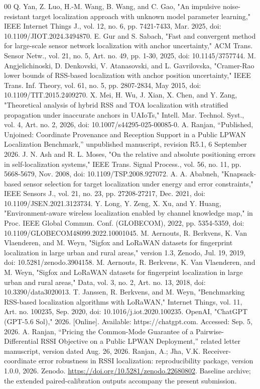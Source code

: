 \documentclass[11pt,a4paper]{article}
\begin{document}
\begin{thebibliography}{00}
 Q. Yan, Z. Luo, H.-M. Wang, B. Wang, and C. Gao, "An impulsive noise-resistant target localization approach with unknown model parameter learning," IEEE Internet Things J., vol. 12, no. 6, pp. 7421-7433, Mar. 2025, doi: 10.1109/JIOT.2024.3494870.
 E. Gur and S. Sabach, "Fast and convergent method for large-scale sensor network localization with anchor uncertainty," ACM Trans. Sensor Netw., vol. 21, no. 5, Art. no. 49, pp. 1-30, 2025, doi: 10.1145/3757744.
 M. Angjelichinoski, D. Denkovski, V. Atanasovski, and L. Gavrilovska, "Cramer-Rao lower bounds of RSS-based localization with anchor position uncertainty," IEEE Trans. Inf. Theory, vol. 61, no. 5, pp. 2807-2834, May 2015, doi: 10.1109/TIT.2015.2409270.
 X. Mei, H. Wu, J. Xian, X. Chen, and Y. Zang, "Theoretical analysis of hybrid RSS and TOA localization with stratified propagation under inaccurate anchors in UAIoTs," Intell. Mar. Technol. Syst., vol. 4, Art. no. 2, 2026, doi: 10.1007/s44295-025-00085-0.
 A. Ranjan, ``Published, Unjoined: Coordinate Provenance and Reception Support in a Public LPWAN Localization Benchmark,'' unpublished manuscript, revision R5.1, 6 September 2026.
 J. N. Ash and R. L. Moses, "On the relative and absolute positioning errors in self-localization systems," IEEE Trans. Signal Process., vol. 56, no. 11, pp. 5668-5679, Nov. 2008, doi: 10.1109/TSP.2008.927072.
 A. A. Ababneh, "Knapsack-based sensor selection for target localization under energy and error constraints," IEEE Sensors J., vol. 21, no. 23, pp. 27208-27217, Dec. 2021, doi: 10.1109/JSEN.2021.3123734.
 Y. Long, Y. Zeng, X. Xu, and Y. Huang, "Environment-aware wireless localization enabled by channel knowledge map," in Proc. IEEE Global Commun. Conf. (GLOBECOM), 2022, pp. 5354-5359, doi: 10.1109/GLOBECOM48099.2022.10001045.
 M. Aernouts, R. Berkvens, K. Van Vlaenderen, and M. Weyn, "Sigfox and LoRaWAN datasets for fingerprint localization in large urban and rural areas," version 1.3, Zenodo, Jul. 19, 2019, doi: 10.5281/zenodo.3904158.
 M. Aernouts, R. Berkvens, K. Van Vlaenderen, and M. Weyn, "Sigfox and LoRaWAN datasets for fingerprint localization in large urban and rural areas," Data, vol. 3, no. 2, Art. no. 13, 2018, doi: 10.3390/data3020013.
 T. Janssen, R. Berkvens, and M. Weyn, "Benchmarking RSS-based localization algorithms with LoRaWAN," Internet Things, vol. 11, Art. no. 100235, Sep. 2020, doi: 10.1016/j.iot.2020.100235.
 OpenAI, "ChatGPT (GPT-5.6 Sol)," 2026. [Online]. Available: https://chatgpt.com. Accessed: Sep. 5, 2026.
 A. Ranjan, ``Pricing the Common-Mode Guarantee of a Pairwise-Differential RSSI Objective on a Public LPWAN Deployment,'' related letter manuscript, version dated Aug. 26, 2026.
 Ranjan, A.; Jha, V.K. Receiver-coordinate error robustness in RSSI localization: reproducibility package, version 1.0.0, 2026. Zenodo. \url{https://doi.org/10.5281/zenodo.22680802}. Baseline archive; the extended paired-calibration outputs accompany the present submission.
\end{thebibliography}
\end{document}
